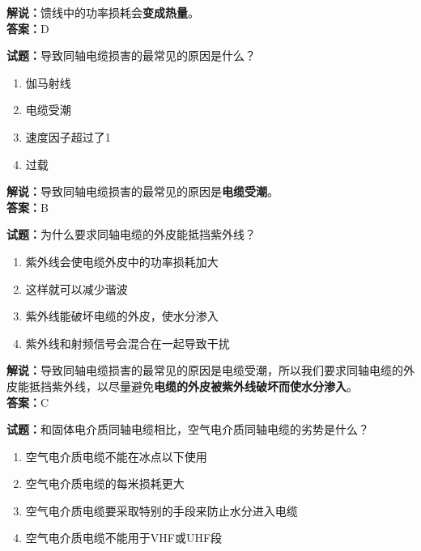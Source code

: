 \documentclass{ctexbook}
\begin{document}
\noindent\textbf{解说：}馈线中的功率损耗会\textbf{变成热量}。\\\noindent\textbf{答案：}D

\vspace{\baselineskip}

\noindent\textbf{试题：}导致同轴电缆损害的最常见的原因是什么？

\begin{enumerate}[leftmargin=3em]
  \item 伽马射线
  \item 电缆受潮
  \item 速度因子超过了1
  \item 过载
\end{enumerate}

\noindent\textbf{解说：}导致同轴电缆损害的最常见的原因是\textbf{电缆受潮}。\\\noindent\textbf{答案：}B

\vspace{\baselineskip}

\noindent\textbf{试题：}为什么要求同轴电缆的外皮能抵挡紫外线？

\begin{enumerate}[leftmargin=3em]

  \item 紫外线会使电缆外皮中的功率损耗加大
  \item 这样就可以减少谐波
  \item 紫外线能破坏电缆的外皮，使水分渗入
  \item 紫外线和射频信号会混合在一起导致干扰
\end{enumerate}

\noindent\textbf{解说：}导致同轴电缆损害的最常见的原因是电缆受潮，所以我们要求同轴电缆的外皮能抵挡紫外线，以尽量避免\textbf{电缆的外皮被紫外线破坏而使水分渗入}。\\\noindent\textbf{答案：}C

\vspace{\baselineskip}

\noindent\textbf{试题：}和固体电介质同轴电缆相比，空气电介质同轴电缆的劣势是什么？

\begin{enumerate}[leftmargin=3em]
  \item 空气电介质电缆不能在冰点以下使用
  \item 空气电介质电缆的每米损耗更大
  \item 空气电介质电缆要采取特别的手段来防止水分进入电缆
  \item 空气电介质电缆不能用于VHF或UHF段
\end{enumerate}
\end{document}
